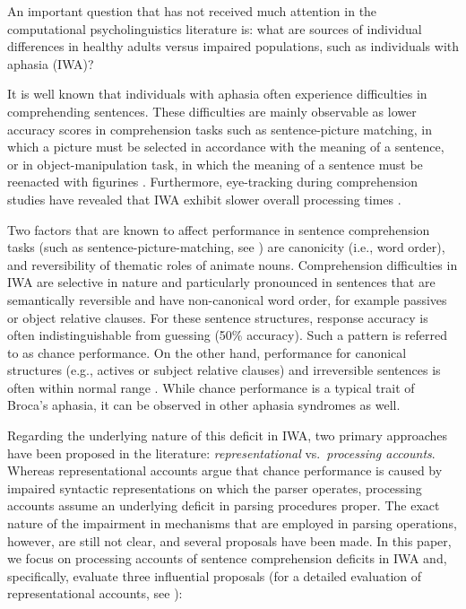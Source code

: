 \documentclass{cambridge7A}\usepackage[]{graphicx}\usepackage[]{color}
\begin{document}
An important question that has not received much attention in the computational psycholinguistics literature is: what are sources of individual differences in healthy adults versus impaired populations, such as individuals with aphasia (IWA)? 

It is well known that individuals with aphasia often experience difficulties in comprehending sentences. These difficulties are mainly observable as lower accuracy scores in comprehension tasks such as sentence-picture matching, in which a picture must be selected in accordance with the meaning of a sentence, or in object-manipulation task, in which the meaning of a sentence must be reenacted with figurines \citep[see literature review in][]{PatilEtAl2016}. Furthermore, eye-tracking during comprehension studies have revealed that IWA exhibit slower overall processing times \citep{hanneetal11}.

Two factors that are known to affect performance in sentence comprehension tasks (such as sentence-picture-matching, see \cite{hanneetal11}) are canonicity (i.e., word order), and reversibility of thematic roles of animate nouns. Comprehension difficulties in IWA are selective in nature and particularly pronounced in sentences that are semantically reversible and have non-canonical word order, for example passives or object relative clauses. For these sentence structures, response accuracy is often indistinguishable from guessing (50\% accuracy). Such a pattern is referred to as chance performance. On the other hand, performance for canonical structures (e.g., actives or subject relative clauses) and irreversible sentences is often within normal range \citep{hanneetal11}. While chance performance is a typical trait of Broca's aphasia, it can be observed in other aphasia syndromes as well.

Regarding the underlying nature of this deficit in IWA, two primary approaches have been proposed in the literature: \emph{representational} vs.\ \emph{processing accounts}. Whereas representational accounts \citep{Grodzinsky:1995} argue that chance performance is caused by impaired syntactic representations on which the parser operates, processing accounts assume an underlying deficit in parsing procedures proper. The exact nature of the impairment in mechanisms that are employed in parsing operations, however, are still not clear, and several proposals have been made. In this paper, we focus on processing accounts of sentence comprehension deficits in IWA and, specifically, evaluate three influential proposals  (for a detailed evaluation of representational accounts, see \cite{PatilEtAl2016}):
\end{document}
